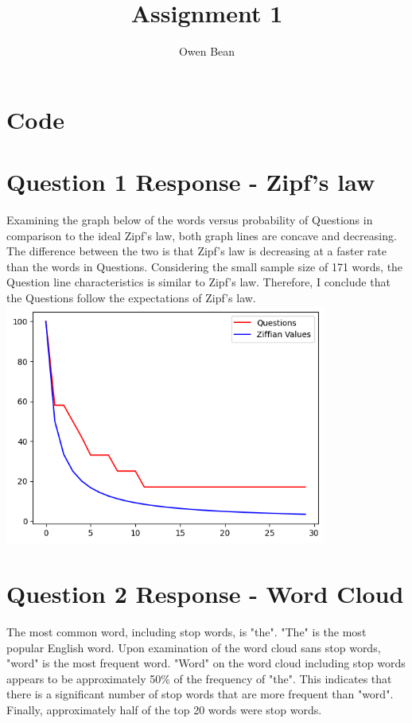 \documentclass{article}
\title{Assignment 1}
\author{Owen Bean}
\begin{document}
\maketitle

\section{Code}



\section{Question 1 Response - Zipf's law}

Examining the graph below of the words versus probability of Questions in comparison to the ideal Zipf's law, both graph lines are concave and decreasing. The difference between the two is that Zipf's law is decreasing at a faster rate than the words in Questions. Considering the small sample size of 171 words, the Question line characteristics is similar to Zipf's law. Therefore, I conclude that the Questions follow the expectations of Zipf's law.
\\

\includegraphics[width=400]{images/zipf.png}

\section{Question 2 Response - Word Cloud}

The most common word, including stop words, is "the". "The" is the most popular English word. Upon examination of the word cloud sans stop words, "word" is the most frequent word. "Word" on the word cloud including stop words appears to be approximately 50\% of the frequency of "the". This indicates that there is a significant number of stop words that are more frequent than "word". Finally, approximately half of the top 20 words were stop words. \\ \\
\end{document}
